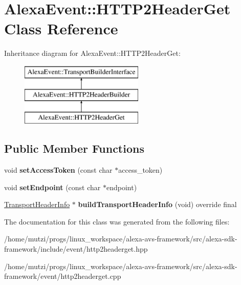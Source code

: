\hypertarget{classAlexaEvent_1_1HTTP2HeaderGet}{}\section{Alexa\+Event\+:\+:H\+T\+T\+P2\+Header\+Get Class Reference}
\label{classAlexaEvent_1_1HTTP2HeaderGet}
Inheritance diagram for Alexa\+Event\+:\+:H\+T\+T\+P2\+Header\+Get\+:\begin{figure}[H]
\begin{center}
\leavevmode
\includegraphics[height=3.000000cm]{d1/d77/classAlexaEvent_1_1HTTP2HeaderGet}
\end{center}
\end{figure}
\subsection*{Public Member Functions}
\begin{DoxyCompactItemize}
\item 
\mbox{\label{classAlexaEvent_1_1HTTP2HeaderGet_a4cf14fcaf7648212589c6a2f05e02a1c}} 
void {\bfseries set\+Access\+Token} (const char $\ast$access\+\_\+token)
\item 
\mbox{\label{classAlexaEvent_1_1HTTP2HeaderGet_a36cdbf90c6b3dce4d436852c526c516e}} 
void {\bfseries set\+Endpoint} (const char $\ast$endpoint)
\item 
\mbox{\label{classAlexaEvent_1_1HTTP2HeaderGet_a32fd34b5cec28b9a2277b7bcb05f1ccf}} 
\hyperlink{classAlexaEvent_1_1TransportHeaderInfo}{Transport\+Header\+Info} $\ast$ {\bfseries build\+Transport\+Header\+Info} (void) override final
\end{DoxyCompactItemize}


The documentation for this class was generated from the following files\+:\begin{DoxyCompactItemize}
\item 
/home/mutzi/progs/linux\+\_\+workspace/alexa-\/avs-\/framework/src/alexa-\/sdk-\/framework/include/event/http2headerget.\+hpp\item 
/home/mutzi/progs/linux\+\_\+workspace/alexa-\/avs-\/framework/src/alexa-\/sdk-\/framework/event/http2headerget.\+cpp\end{DoxyCompactItemize}
